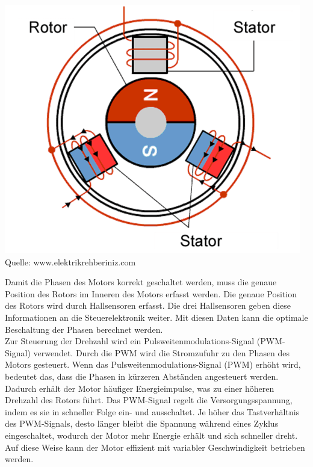 \documentclass[ngerman,12pt,a4paper]{article}
\begin{document}
			\begin{center}
				\begin{minipage}{\textwidth}
					\centering
					\includegraphics[scale=0.3]{Pictures/BLDC_Motor}
					\label{fig:spiffs_init}
					\vspace{-2pt}
					\small Quelle: www.elektrikrehberiniz.com
				\end{minipage}
			\end{center}
			Damit die Phasen des Motors korrekt geschaltet werden, muss die genaue Position des Rotors im Inneren des Motors erfasst werden. Die genaue Position des Rotors wird durch Hallsensoren erfasst. Die drei Hallsensoren geben diese Informationen an die Steuerelektronik weiter. Mit diesen Daten kann die optimale Beschaltung der Phasen berechnet werden.\\[0.5cm]
			Zur Steuerung der Drehzahl wird ein Pulsweitenmodulations-Signal (PWM-Signal) verwendet. Durch die PWM wird die Stromzufuhr zu den Phasen des Motors gesteuert. Wenn das Pulsweitenmodulations-Signal (PWM) erhöht wird, bedeutet das, dass die Phasen in kürzeren Abständen angesteuert werden. Dadurch erhält der Motor häufiger Energieimpulse, was zu einer höheren Drehzahl des Rotors führt. Das PWM-Signal regelt die Versorgungsspannung, indem es sie in schneller Folge ein- und ausschaltet. Je höher das Tastverhältnis des PWM-Signals, desto länger bleibt die Spannung während eines Zyklus eingeschaltet, wodurch der Motor mehr Energie erhält und sich schneller dreht.\\[0.5cm]
			Auf diese Weise kann der Motor effizient mit variabler Geschwindigkeit betrieben werden.
			
\end{document}
